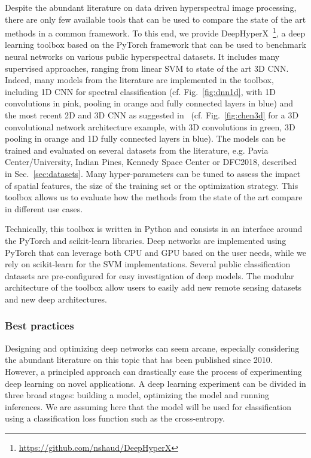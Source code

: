 \documentclass[journal]{IEEEtran}
\begin{document}
Despite the abundant literature on data driven hyperspectral image processing, there are only few available tools that can be used to compare the state of the art methods in a common framework. To this end, we provide {DeepHyperX}~\footnote{\url{https://github.com/nshaud/DeepHyperX}}, a deep learning toolbox based on the PyTorch framework that can be used to benchmark neural networks on various public hyperspectral datasets. It includes many supervised approaches, ranging from linear SVM to state of the art 3D CNN. Indeed, many models from the literature are implemented in the toolbox, including 1D CNN for spectral classification (cf. Fig.~\ref{fig:dnn1d}, with 1D convolutions in pink, pooling in orange and fully connected layers in blue) and the most recent 2D and 3D CNN as suggested in~\cite{ben_hamida_deep_2016,chen_deep_2016,lee_kwon-contextualCNN4HSI_TIP2017,li_spectralspatial_2017} (cf. Fig.~\ref{fig:chen3d} for a 3D convolutional network architecture example, with 3D convolutions in green, 3D pooling in orange and 1D fully connected layers in blue). The models can be trained and evaluated on several datasets from the literature, e.g. Pavia Center/University, Indian Pines, Kennedy Space Center or DFC2018, described in Sec.~\ref{sec:datasets}. Many hyper-parameters can be tuned to assess the impact of spatial features, the size of the training set or the optimization strategy. This toolbox allows us to evaluate how the methods from the state of the art compare in different use cases.




Technically, this toolbox is written in Python and consists in an interface around the PyTorch and scikit-learn libraries. Deep networks are implemented using PyTorch that can leverage both CPU and GPU based on the user needs, while we rely on scikit-learn for the SVM implementations. Several public classification datasets are pre-configured for easy investigation of deep models. The modular architecture of the toolbox allow users to easily add new remote sensing datasets and new deep architectures.

\subsubsection{Best practices}



Designing and optimizing deep networks can seem arcane, especially considering the abundant literature on this topic that has been published since 2010. However, a principled approach can drastically ease the process of experimenting deep learning on novel applications. A deep learning experiment can be divided in three broad stages: building a model, optimizing the model and running inferences. We are assuming here that the model will be used for classification using a classification loss function such as the cross-entropy.
\end{document}
